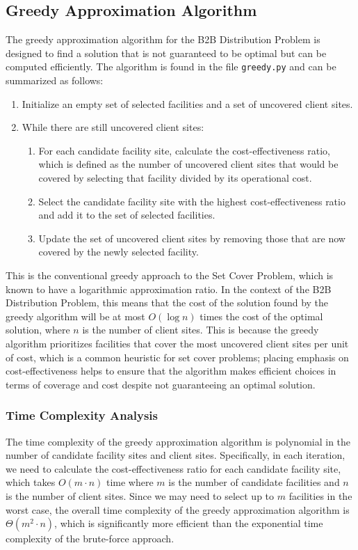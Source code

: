 \documentclass[letterpaper]{article}
\begin{document}
\subsection{Greedy Approximation Algorithm}
The greedy approximation algorithm for the B2B Distribution Problem is designed to find a solution that is not guaranteed to be optimal but can be computed efficiently. The algorithm is found in the file \texttt{greedy.py} and can be summarized as follows:
\begin{enumerate}[label=\textbf{Step \arabic*.}]
    \item Initialize an empty set of selected facilities and a set of uncovered client sites.
    \item While there are still uncovered client sites:
    \begin{enumerate}[label=\textbf{\alph*.}]
        \item For each candidate facility site, calculate the cost-effectiveness ratio, which is defined as the number of uncovered client sites that would be covered by selecting that facility divided by its operational cost.
        \item Select the candidate facility site with the highest cost-effectiveness ratio and add it to the set of selected facilities.
        \item Update the set of uncovered client sites by removing those that are now covered by the newly selected facility.
    \end{enumerate}
\end{enumerate}

This is the conventional greedy approach to the Set Cover Problem, which is known to have a logarithmic approximation ratio. In the context of the B2B Distribution Problem, this means that the cost of the solution found by the greedy algorithm will be at most $O(\log n)$ times the cost of the optimal solution, where $n$ is the number of client sites. This is because the greedy algorithm prioritizes facilities that cover the most uncovered client sites per unit of cost, which is a common heuristic for set cover problems; placing emphasis on cost-effectiveness helps to ensure that the algorithm makes efficient choices in terms of coverage and cost despite not guaranteeing an optimal solution.

\subsubsection{Time Complexity Analysis}
The time complexity of the greedy approximation algorithm is polynomial in the number of candidate facility sites and client sites. Specifically, in each iteration, we need to calculate the cost-effectiveness ratio for each candidate facility site, which takes $O(m \cdot n)$ time where $m$ is the number of candidate facilities and $n$ is the number of client sites. Since we may need to select up to $m$ facilities in the worst case, the overall time complexity of the greedy approximation algorithm is $\Theta(m^2 \cdot n)$, which is significantly more efficient than the exponential time complexity of the brute-force approach.
\end{document}
